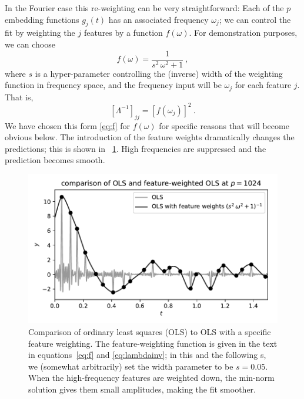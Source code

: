 \documentclass[12pt,letterpaper]{article}
\newlength{\figurewidth}
\begin{document}
In the Fourier case this re-weighting can be very straightforward: Each of the $p$ embedding functions $g_j(t)$ has an associated frequency $\omega_j$; we can control the fit by weighting the $j$ features by a function $f(\omega)$.
For demonstration purposes, we can choose
\begin{equation}\label{eq:f}
    f(\omega) = \frac{1}{s^2\,\omega^2 + 1}
    ~,
\end{equation}
where $s$ is a hyper-parameter controlling the (inverse) width of the weighting function in frequency space, and the frequency input will be $\omega_j$ for each feature $j$. That is,
\begin{equation}\label{eq:lambdainv}
    [\Lambda^{-1}]_{jj} = [f(\omega_j)]^2
    ~.
\end{equation}
We have chosen this form \eqref{eq:f} for $f(\omega)$ for specific reasons that will become obvious below.
The introduction of the feature weights dramatically changes the predictions; this is shown in \figurename~\ref{fig:fwols}.
High frequencies are suppressed and the prediction becomes smooth.
\begin{figure}[t]
    \begin{mdframed}
    \includegraphics[width=\figurewidth]{paper/weighted-OLS.pdf}
    \caption{Comparison of ordinary least squares (OLS) to OLS with a specific feature weighting. The feature-weighting function is given in the text in equations~\eqref{eq:f} and \eqref{eq:lambdainv}; in this and the following \figurename s, we (somewhat arbitrarily) set the width parameter to be $s=0.05$. When the high-frequency features are weighted down, the min-norm solution gives them small amplitudes, making the fit smoother.}
    \label{fig:fwols}
    \end{mdframed}
\end{figure}
\end{document}
